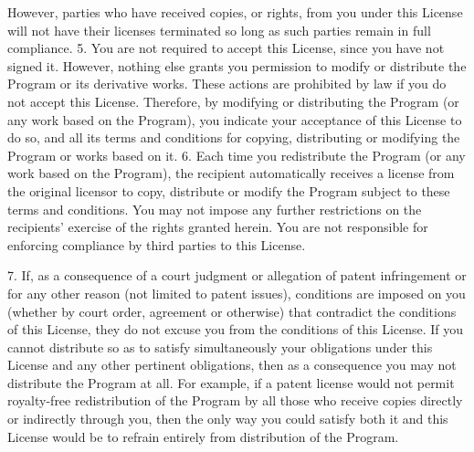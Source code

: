 \begin{DoxyCodeInclude}
\textcolor{stringliteral}{However, parties who have received copies, or rights, from you under}
\textcolor{stringliteral}{this License will not have their licenses terminated so long as such}
\textcolor{stringliteral}{parties remain in full compliance.}
\textcolor{stringliteral}{}
\textcolor{stringliteral}{  5. You are not required to accept this License, since you have not}
\textcolor{stringliteral}{signed it.  However, nothing else grants you permission to modify or}
\textcolor{stringliteral}{distribute the Program or its derivative works.  These actions are}
\textcolor{stringliteral}{prohibited by law if you do not accept this License.  Therefore, by}
\textcolor{stringliteral}{modifying or distributing the Program (or any work based on the}
\textcolor{stringliteral}{Program), you indicate your acceptance of this License to do so, and}
\textcolor{stringliteral}{all its terms and conditions for copying, distributing or modifying}
\textcolor{stringliteral}{the Program or works based on it.}
\textcolor{stringliteral}{}
\textcolor{stringliteral}{  6. Each time you redistribute the Program (or any work based on the}
\textcolor{stringliteral}{Program), the recipient automatically receives a license from the}
\textcolor{stringliteral}{original licensor to copy, distribute or modify the Program subject to}
\textcolor{stringliteral}{these terms and conditions.  You may not impose any further}
\textcolor{stringliteral}{restrictions on the recipients'} exercise of the rights granted herein.
You are not responsible \textcolor{keywordflow}{for} enforcing compliance by third parties to
\textcolor{keyword}{this} License.

  7. If, as a consequence of a court judgment or allegation of patent
infringement or \textcolor{keywordflow}{for} any other reason (not limited to patent issues),
conditions are imposed on you (whether by court order, agreement or
otherwise) that contradict the conditions of \textcolor{keyword}{this} License, they \textcolor{keywordflow}{do} not
excuse you from the conditions of \textcolor{keyword}{this} License.  If you cannot
distribute so as to satisfy simultaneously your obligations under \textcolor{keyword}{this}
License and any other pertinent obligations, then as a consequence you
may not distribute the Program at all.  For example, \textcolor{keywordflow}{if} a patent
license would not permit royalty-free redistribution of the Program by
all those who receive copies directly or indirectly through you, then
the only way you could satisfy both it and \textcolor{keyword}{this} License would be to
refrain entirely from distribution of the Program.


\end{DoxyCodeInclude}
